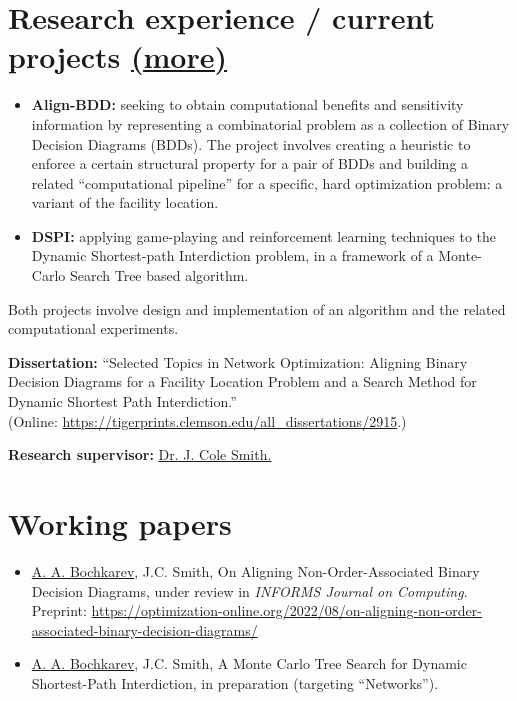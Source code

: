 \documentclass[11pt, a4paper]{article} \usepackage{geometry} %
\newcommand{\mhref}[1]{\hfill\href{#1}{\small (more\faExternalLink*)}}
\begin{document}
  \section*{Research experience / current projects \mhref{https://www.bochkarev.io/research/}}
  \begin{itemize}
    \itemsep0pt
  \item \textbf{Align-BDD:} seeking to obtain computational benefits and
    sensitivity information by representing a combinatorial problem as a
    collection of Binary Decision Diagrams (BDDs). The project involves creating a heuristic to enforce a
    certain structural property for a pair of BDDs and building a related
    ``computational pipeline'' for a specific, hard optimization problem: a
    variant of the facility location. 
  \item \textbf{DSPI:} applying game-playing and reinforcement
    learning techniques to the Dynamic Shortest-path Interdiction problem,
    in a framework of a Monte-Carlo Search Tree based algorithm.
  \end{itemize} 
  Both projects involve design and implementation of an algorithm and
  the related computational experiments.\vspace{0.5em}

  \noindent\textbf{Dissertation:} ``Selected Topics in Network Optimization:
  Aligning Binary Decision Diagrams for a Facility Location Problem and a Search
  Method for Dynamic Shortest Path Interdiction.''\\
  \noindent (Online: \href{https://tigerprints.clemson.edu/all_dissertations/2915}{https://tigerprints.clemson.edu/all\_dissertations/2915}.)
  \vspace{0.5em}

  \noindent\textbf{Research supervisor:}
  \href{https://scholar.google.com/citations?user=87CaUHYAAAAJ&hl=en}{Dr. J. Cole
    Smith.}
  \vspace{1.5em}

 \section*{Working papers}
 \begin{itemize}
    \itemsep0pt
    \item \underline{A. A. Bochkarev}, J.C. Smith, On Aligning
    Non-Order-Associated Binary Decision Diagrams, under review in
    \textit{INFORMS Journal on Computing}. Preprint: \href{https://optimization-online.org/2022/08/on-aligning-non-order-associated-binary-decision-diagrams/}{https://optimization-online.org/2022/08/on-aligning-non-order-associated-binary-decision-diagrams/}
  \item \underline{A. A. Bochkarev}, J.C. Smith, A Monte Carlo Tree Search for
    Dynamic Shortest-Path Interdiction, in preparation (targeting ``Networks'').
 \end{itemize}
\end{document}
